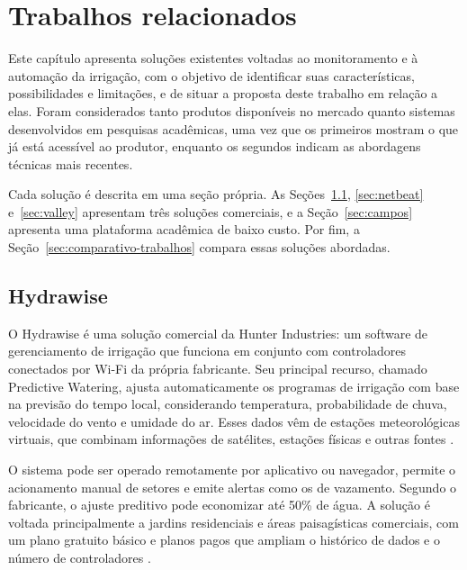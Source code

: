 \chapter{Trabalhos relacionados}
\label{textuais/cap2}
Este capítulo apresenta soluções existentes voltadas ao monitoramento e à
automação da irrigação, com o objetivo de identificar suas características,
possibilidades e limitações, e de situar a proposta deste trabalho em relação a
elas. Foram considerados tanto produtos disponíveis no mercado quanto sistemas
desenvolvidos em pesquisas acadêmicas, uma vez que os primeiros mostram o que
já está acessível ao produtor, enquanto os segundos indicam as abordagens
técnicas mais recentes.

Cada solução é descrita em uma seção própria. As Seções~\ref{sec:hydrawise},
\ref{sec:netbeat} e~\ref{sec:valley} apresentam três soluções comerciais, e a
Seção~\ref{sec:campos} apresenta uma plataforma acadêmica de baixo custo. Por
fim, a Seção~\ref{sec:comparativo-trabalhos} compara essas soluções abordadas.


\section{Hydrawise}
\label{sec:hydrawise}

O Hydrawise é uma solução comercial da Hunter Industries: um software de
gerenciamento de irrigação que funciona em conjunto com controladores
conectados por Wi-Fi da própria fabricante. Seu principal recurso, chamado
Predictive Watering, ajusta automaticamente os programas de irrigação
com base na previsão do tempo local, considerando temperatura, probabilidade de
chuva, velocidade do vento e umidade do ar. Esses dados vêm de estações
meteorológicas virtuais, que combinam informações de satélites, estações
físicas e outras fontes \cite{hunterhydrawise}.

O sistema pode ser operado remotamente por aplicativo ou navegador, permite o
acionamento manual de setores e emite alertas como os de vazamento. Segundo o
fabricante, o ajuste preditivo pode economizar até 50\% de água. A solução é
voltada principalmente a jardins residenciais e áreas paisagísticas
comerciais, com um plano gratuito básico e planos pagos que ampliam o histórico
de dados e o número de controladores \cite{hunterhydrawise}.


